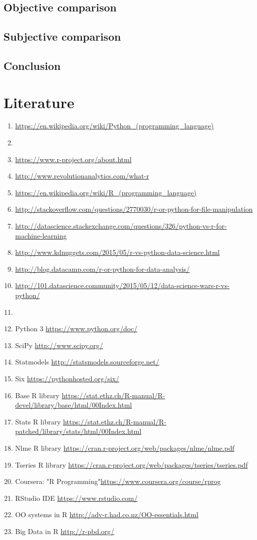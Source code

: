 \documentclass{article}
\begin{document}
\subsection{Objective comparison}
\subsection{Subjective comparison}
\subsection{Conclusion}

\newpage
\section{Literature}
\begin{enumerate}
    \item \url{https://en.wikipedia.org/wiki/Python_(programming_language)}
    \item
    \item \url{https://www.r-project.org/about.html}
    \item \url{http://www.revolutionanalytics.com/what-r}
    \item \url{https://en.wikipedia.org/wiki/R_(programming_language)}
    \item \url{http://stackoverflow.com/questions/2770030/r-or-python-for-file-manipulation}
    \item \url{http://datascience.stackexchange.com/questions/326/python-vs-r-for-machine-learning}
    \item \url{http://www.kdnuggets.com/2015/05/r-vs-python-data-science.html}
    \item \url{http://blog.datacamp.com/r-or-python-for-data-analysis/}
    \item \url{http://101.datascience.community/2015/05/12/data-science-wars-r-vs-python/}
    \item
    \item Python 3 \url{https://www.python.org/doc/}
    \item SciPy \url{http://www.scipy.org/}
    \item Statmodels \url{http://statsmodels.sourceforge.net/}
    \item Six \url{https://pythonhosted.org/six/}
    \item Base R library \url{https://stat.ethz.ch/R-manual/R-devel/library/base/html/00Index.html}
    \item Stats R library \url{https://stat.ethz.ch/R-manual/R-patched/library/stats/html/00Index.html}
    \item Nlme R library \url{https://cran.r-project.org/web/packages/nlme/nlme.pdf}
    \item Tseries R library \url{https://cran.r-project.org/web/packages/tseries/tseries.pdf}
    \item Coursera: "R Programming"\url{https://www.coursera.org/course/rprog}
    \item RStudio IDE \url{https://www.rstudio.com/}
    \item OO systems in R \url{http://adv-r.had.co.nz/OO-essentials.html}
    \item Big Data in R \url{http://r-pbd.org/}
\end{enumerate}
\end{document}
